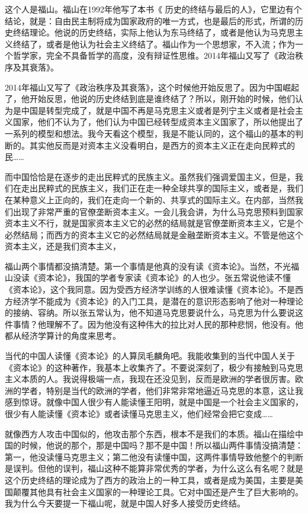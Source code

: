 \documentclass[UTF8, 12pt, a4paper]{ctexrep}
\begin{document}
这个人是福山。福山在1992年他写了本书《 历史的终结与最后的人》，它里边有个结论，就是：自由民主制将成为国家政府的唯一方式，也是最后的形式，所谓的历史终结理论。他说的历史终结，实际上他认为东马终结了，或者是他认为马克思主义终结了，或者是他认为社会主义终结了。福山作为一个思想家，不入流；作为一个哲学家，完全不具备哲学的高度，没有辩证性思维。2014年福山又写了《政治秩序及其衰落》。

2014年福山又写了《政治秩序及其衰落》，这个时候他开始反思了。因为中国崛起了，他开始反思，他说的历史终结到底是谁终结了？所以，刚开始的时候，他们认为是中国是转型完成了，就是中国不再是马克思主义或者是列宁主义或者是社会主义国家，他们不认为了，他们认为中国已经转型成资本主义国家了，所以他提出了一系列的模型和想法。我今天看这个模型，我是不能认同的，这个福山的基本的判断的。其实他反而是对资本主义没看明白，是西方的资本主义正在走向民粹式的民……

而中国恰恰是在逐步的走出民粹式的民族主义。虽然我们强调爱国主义，但是，我们在走出民粹式的民族主义，我们正在走一种全球共享的国际主义，或者是，我们在某种意义上正向的，我们在走向一个新的、共享式的国际主义。在内部，当然我们出现了非常严重的官僚垄断资本主义。一会儿我会讲，为什么马克思预料到国家资本主义不行，就是国家资本主义它的必然的结局就是官僚垄断资本主义，它是个必然结局；而西方的资本主义它的必然结局就是金融垄断资本主义。不管是他这个资本主义，还是我们资本主义，

福山两个事情都没搞清楚。第一个事情是他真的没有读《资本论》。当然，不光福山没读《资本论》，我国的学者专家读《资本论》的人也少。张五常说他读不懂《资本论》，这个我同意。因为受西方经济学训练的人很难读懂《资本论》。不是西方经济学不能成为《资本论》的入门工具，是潜在的意识形态影响了他对一种理论的接纳、容纳。所以张五常认为，他不知道马克思要说什么，马克思为什么要说这件事情？他理解不了。因为他没有这种伟大的拉比对人民的那种悲悯，他没有。他都从经济学算计的角度来思考。

当代的中国人读懂《资本论》的人算凤毛麟角吧。我能收集到的当代中国人关于《资本论》的这种著作，我基本上收集齐了。不要说深刻了，极少有接触到马克思主义本质的人。我说得极端一点，我现在还没见到，反而是欧洲的学者很厉害。欧洲的学者，特别是当代的欧洲的学者，他们非常非常地逼近马克思的本意，这让我感到惊讶。就像中国人很少有人能读懂王阳明，就是中国是一个社会主义国家的，很少有人能读懂《资本论》或者读懂马克思主义，他们经常会把它变成……

就像西方人攻击中国似的，他攻击那个东西，根本不是我们的本质。福山在描绘中国的时候，他说的那个，那是中国吗？那不是中国！所以福山两件事情没搞清楚：第一，他没读懂马克思主义；第二他没有读懂中国，这两件事情导致他整个的判断是误判。但他的误判，福山这种不能算非常优秀的学者，为什么这么有名呢？就是这个历史终结的理论成为了西方的政治上的一种工具，或者是成为美国，主要是美国颠覆其他具有社会主义国家的一种理论工具。它对中国还是产生了巨大影响的。我为什么今天要提一下福山呢，就是中国人好多人接受历史终结。
\end{document}
